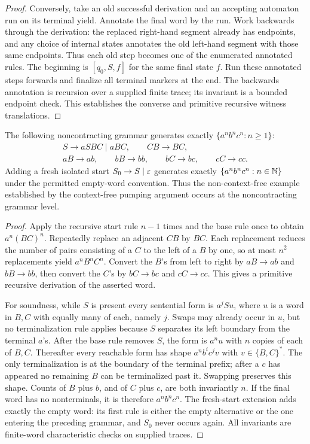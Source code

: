 \begin{proof}
Conversely, take an old successful derivation and an accepting automaton
run on its terminal yield.  Annotate the final word by the run.  Work
backwards through the derivation: the replaced right-hand segment already
has endpoints, and any choice of internal states annotates the old
left-hand segment with those same endpoints.  Thus each old step becomes
one of the enumerated annotated rules.  The beginning is
$[q_0,S,f]$ for the same final state $f$.  Run these annotated steps forwards
and finalize all terminal markers at the end.  The backwards annotation
is recursion over a supplied finite trace; its invariant is a bounded
endpoint check.  This establishes the converse and primitive recursive
witness translations.
\end{proof}

\begin{proposition}\label{eff:abc}
The following noncontracting grammar generates exactly
$\{a^n b^n c^n:n\geq1\}$:
\[
\begin{gathered}
 S\to aSBC\mid aBC,\qquad CB\to BC,\\
 aB\to ab,\qquad bB\to bb,\qquad bC\to bc,\qquad cC\to cc.
\end{gathered}
\]
Adding a fresh isolated start $S_0\to S\mid\varepsilon$ generates exactly
$\{a^n b^n c^n:n\in\mathbb N\}$ under the permitted empty-word convention.
Thus the non-context-free example established by the context-free pumping
argument occurs at the noncontracting grammar level.
\end{proposition}
\begin{proof}
Apply the recursive start rule $n-1$ times and the base rule once to obtain
$a^n(BC)^n$.  Repeatedly replace an adjacent $CB$ by $BC$.  Each replacement
reduces the number of pairs consisting of a $C$ to the left of a $B$ by
one, so at most $n^2$ replacements yield $a^n B^n C^n$.  Convert the $B$'s
from left to right by $aB\to ab$ and $bB\to bb$, then convert the $C$'s by
$bC\to bc$ and $cC\to cc$.  This gives a primitive recursive derivation
of the asserted word.

For soundness, while $S$ is present every sentential form is $a^j S u$,
where $u$ is a word in $B,C$ with equally many of each, namely $j$.
Swaps may already occur in $u$, but no terminalization rule applies because
$S$ separates its left boundary from the terminal $a$'s.  After the base
rule removes $S$, the form is $a^n u$ with $n$ copies of each of $B,C$.
Thereafter every reachable form has shape $a^n b^i c^j v$ with
$v\in\{B,C\}^*$.  The only terminalization is at the boundary of the
terminal prefix; after a $c$ has appeared no remaining $B$ can be
terminalized past it.  Swapping preserves this shape.  Counts of
$B$ plus $b$, and of $C$ plus $c$, are both invariantly $n$.
If the final word has no nonterminals, it is therefore $a^n b^n c^n$.
The fresh-start extension adds exactly the empty word: its first rule is
either the empty alternative or the one entering the preceding grammar,
and $S_0$ never occurs again.  All invariants are finite-word characteristic
checks on supplied traces.
\end{proof}

